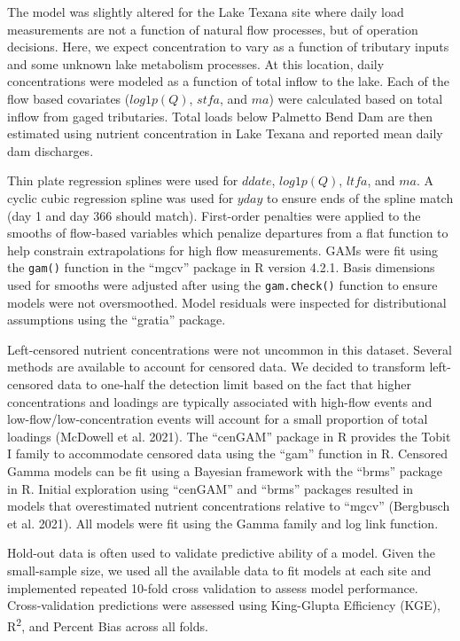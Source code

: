 \documentclass[
]{article}
\begin{document}
The model was slightly altered for the Lake Texana site where daily load
measurements are not a function of natural flow processes, but of
operation decisions. Here, we expect concentration to vary as a function
of tributary inputs and some unknown lake metabolism processes. At this
location, daily concentrations were modeled as a function of total
inflow to the lake. Each of the flow based covariates (\(log1p(Q)\),
\(stfa\), and \(ma\)) were calculated based on total inflow from gaged
tributaries. Total loads below Palmetto Bend Dam are then estimated
using nutrient concentration in Lake Texana and reported mean daily dam
discharges.

Thin plate regression splines were used for \(ddate\), \(log1p(Q)\),
\(ltfa\), and \(ma\). A cyclic cubic regression spline was used for
\(yday\) to ensure ends of the spline match (day 1 and day 366 should
match). First-order penalties were applied to the smooths of flow-based
variables which penalize departures from a flat function to help
constrain extrapolations for high flow measurements. GAMs were fit using
the \texttt{gam()} function in the ``mgcv'' package in R version 4.2.1.
Basis dimensions used for smooths were adjusted after using the
\texttt{gam.check()} function to ensure models were not oversmoothed.
Model residuals were inspected for distributional assumptions using the
``gratia'' package.

Left-censored nutrient concentrations were not uncommon in this dataset.
Several methods are available to account for censored data. We decided
to transform left-censored data to one-half the detection limit based on
the fact that higher concentrations and loadings are typically
associated with high-flow events and low-flow/low-concentration events
will account for a small proportion of total loadings (McDowell et al.
2021). The ``cenGAM'' package in R provides the Tobit I family to
accommodate censored data using the ``gam'' function in R. Censored
Gamma models can be fit using a Bayesian framework with the ``brms''
package in R. Initial exploration using ``cenGAM'' and ``brms'' packages
resulted in models that overestimated nutrient concentrations relative
to ``mgcv'' (Bergbusch et al. 2021). All models were fit using the Gamma
family and log link function.

Hold-out data is often used to validate predictive ability of a model.
Given the small-sample size, we used all the available data to fit
models at each site and implemented repeated 10-fold cross validation to
assess model performance. Cross-validation predictions were assessed
using King-Glupta Efficiency (KGE), R\textsuperscript{2}, and Percent
Bias across all folds.
\end{document}
